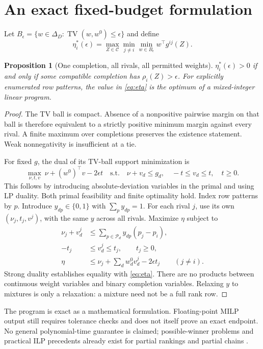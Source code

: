\documentclass[11pt,a4paper]{article}
\newtheorem{proposition}{Proposition}
\newcommand{\TV}{\operatorname{TV}}
\newcommand{\C}{\mathcal C}
\newcommand{\Pset}{\mathcal P}
\begin{document}
\newpage
\section{An exact fixed-budget formulation}
Let $B_\epsilon=\{w\in\Delta_D:\TV(w,w^0)\leq\epsilon\}$ and define
\begin{equation}\label{eq:eta}
\eta_i^*(\epsilon)=\max_{Z\in\C}\min_{j\ne i}\min_{w\in B_\epsilon}
 w^\top g^{ij}(Z).
\end{equation}
\begin{proposition}[One completion, all rivals, all permitted weights]
$\eta_i^*(\epsilon)>0$ if and only if some compatible completion has
$\rho_i(Z)>\epsilon$. For explicitly enumerated row patterns, the value in
\eqref{eq:eta} is the optimum of a mixed-integer linear program.
\end{proposition}
\begin{proof}
The TV ball is compact. Absence of a nonpositive pairwise margin on that ball is
therefore equivalent to a strictly positive minimum margin against every rival.
A finite maximum over completions preserves the existence statement. Weak
nonnegativity is insufficient at a tie.

For fixed $g$, the dual of its TV-ball support minimization is
\begin{equation}\label{eq:dual}
\max_{\nu,t,v}\ \nu+(w^0)^\top v-2\epsilon t
\quad\text{s.t.}\quad \nu+v_d\leq g_d,\quad -t\leq v_d\leq t,\quad t\geq0.
\end{equation}
This follows by introducing absolute-deviation variables in the primal and
using LP duality. Both primal feasibility and finite optimality hold.
Index row patterns by $p$. Introduce $y_{dp}\in\{0,1\}$ with
$\sum_p y_{dp}=1$. For each rival $j$, use its own $(\nu_j,t_j,v^j)$, with the
same $y$ across all rivals. Maximize $\eta$ subject to
\begin{align}
\nu_j+v^j_d&\leq\sum_{p\in\Pset_d}y_{dp}(p_j-p_i),\\
-t_j&\leq v^j_d\leq t_j,\qquad t_j\geq0,\\
\eta&\leq\nu_j+\sum_d w_d^0v^j_d-2\epsilon t_j\qquad(j\ne i).
\end{align}
Strong duality establishes equality with \eqref{eq:eta}. There are no products
between continuous weight variables and binary completion variables. Relaxing
$y$ to mixtures is only a relaxation: a mixture need not be a full rank row.
\end{proof}

The program is exact as a mathematical formulation. Floating-point MILP output
still requires tolerance checks and does not itself prove an exact endpoint.
No general polynomial-time guarantee is claimed; possible-winner problems and
practical ILP precedents already exist for partial rankings and partial chains
\cite{chakraborty,chains}.
\end{document}
